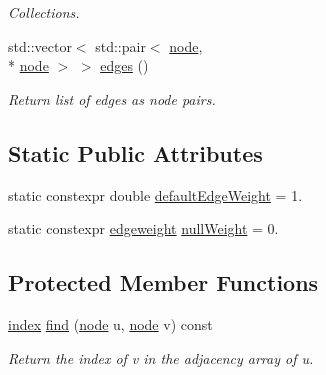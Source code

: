 \begin{DoxyCompactItemize}
\begin{DoxyCompactList}\small\item\em Collections. \end{DoxyCompactList}\item 
std\-::vector$<$ std\-::pair$<$ \hyperlink{namespace_networ_kit_a53fe3e4fd04ea024160e4d024dfebadf}{node}, \\*
\hyperlink{namespace_networ_kit_a53fe3e4fd04ea024160e4d024dfebadf}{node} $>$ $>$ \hyperlink{class_networ_kit_1_1_graph_a2d9138714da1eafdfddae8ff83ffdf3e}{edges} ()
\begin{DoxyCompactList}\small\item\em Return list of edges as node pairs. \end{DoxyCompactList}\end{DoxyCompactItemize}
\subsection*{Static Public Attributes}
\begin{DoxyCompactItemize}
\item 
static constexpr double \hyperlink{class_networ_kit_1_1_graph_af32663b9ad67bae546281e7725db3519}{default\-Edge\-Weight} = 1.
\item 
static constexpr \hyperlink{namespace_networ_kit_a831b108dbcd79dad062d9e28b1b4e3dd}{edgeweight} \hyperlink{class_networ_kit_1_1_graph_a4b97f82f62865c47a7a2e1309f90c676}{null\-Weight} = 0.
\end{DoxyCompactItemize}
\subsection*{Protected Member Functions}
\begin{DoxyCompactItemize}
\item 
\hyperlink{namespace_networ_kit_a486772e5516be73694ef0d780b828d04}{index} \hyperlink{class_networ_kit_1_1_graph_a4c6dde807d9cd6dd53f3a4794d411528}{find} (\hyperlink{namespace_networ_kit_a53fe3e4fd04ea024160e4d024dfebadf}{node} u, \hyperlink{namespace_networ_kit_a53fe3e4fd04ea024160e4d024dfebadf}{node} v) const 
\begin{DoxyCompactList}\small\item\em Return the index of v in the adjacency array of u. \end{DoxyCompactList}\end{DoxyCompactItemize}

